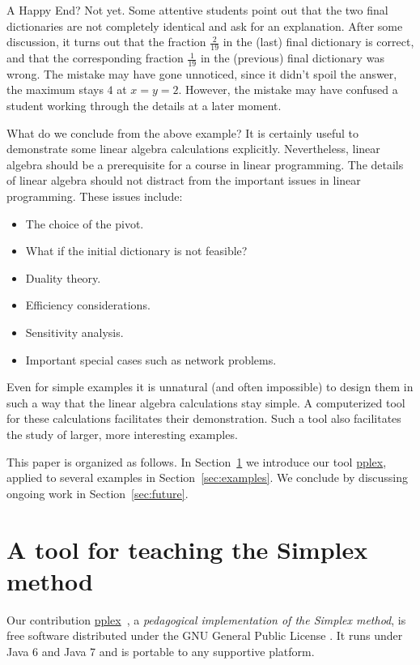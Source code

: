 \documentclass[ukenglish]{nik}
\begin{document}
A Happy End? Not yet. Some attentive students point out that the two final dictionaries
are not completely identical and ask for an explanation. After some discussion, it turns
out that the fraction $\frac{2}{19}$ in the (last) final dictionary is correct,
and that the corresponding fraction $\frac{1}{19}$ in the (previous) final dictionary was wrong.
The mistake may have gone unnoticed, since it didn't spoil the answer, the maximum stays
$4$ at $x=y=2$. However, the mistake may have confused a student working through the details at a later moment.

What do we conclude from the above example? It is certainly useful to demonstrate some
linear algebra calculations explicitly. Nevertheless, linear algebra should be a prerequisite for a course
in linear programming. The details of linear algebra should not distract from the important
issues in linear programming. These issues include:
\begin{itemize}
\item The choice of the pivot.
\item What if the initial dictionary is not feasible?
\item Duality theory.
\item Efficiency considerations.
\item Sensitivity analysis.
\item Important special cases such as network problems.
\end{itemize}
Even for simple examples it is unnatural (and often impossible)
to design them in such a way that the linear algebra calculations stay simple.
A computerized tool for these calculations facilitates their demonstration. 
Such a tool also facilitates the study of larger, more interesting examples. 

This paper is organized as follows.
In Section~\ref{sec:pplex} we introduce 
our tool \url{pplex}, applied to several examples in Section~\ref{sec:examples}.
We conclude by discussing ongoing work in Section~\ref{sec:future}.

\section{A tool for teaching the Simplex method}\label{sec:pplex}
Our contribution \url{pplex}~\cite{pplex},
a \emph{pedagogical implementation of the Simplex method},
is free software distributed under the GNU General Public License \cite{GNUGPL}.
It runs under Java 6 and Java 7 and is portable to any supportive platform.
\end{document}
